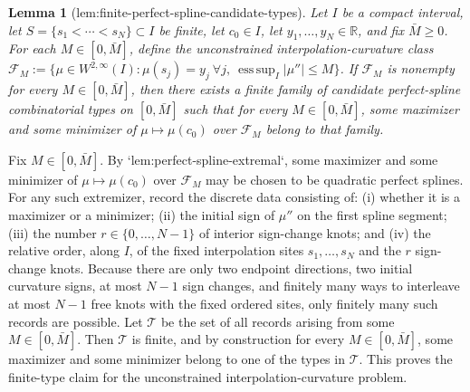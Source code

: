 \documentclass{article}
\newtheorem{lemma}{Lemma}
\begin{document}
\begin{lemma}[lem:finite-perfect-spline-candidate-types]\label{lem:finite-perfect-spline-candidate-types}
Let \(I\) be a compact interval, let \(S=\{s_1<\cdots<s_N\}\subset I\) be finite, let \(c_0\in I\), let \(y_1,\dots,y_N\in \mathbb R\), and fix \(\bar M\ge 0\). For each \(M\in[0,\bar M]\), define the unconstrained interpolation-curvature class \(\mathcal F_M:=\{\mu\in W^{2,\infty}(I): \mu(s_j)=y_j\ \forall j,\ \operatorname*{ess\,sup}_{I}|\mu''|\le M\}\). If \(\mathcal F_M\) is nonempty for every \(M\in[0,\bar M]\), then there exists a finite family of candidate perfect-spline combinatorial types on \([0,\bar M]\) such that for every \(M\in[0,\bar M]\), some maximizer and some minimizer of \(\mu\mapsto\mu(c_0)\) over \(\mathcal F_M\) belong to that family.
\end{lemma}
Fix \(M\in[0,\bar M]\). By `lem:perfect-spline-extremal`, some maximizer and some minimizer of \(\mu\mapsto\mu(c_0)\) over \(\mathcal F_M\) may be chosen to be quadratic perfect splines. For any such extremizer, record the discrete data consisting of: (i) whether it is a maximizer or a minimizer; (ii) the initial sign of \(\mu''\) on the first spline segment; (iii) the number \(r\in\{0,\dots,N-1\}\) of interior sign-change knots; and (iv) the relative order, along \(I\), of the fixed interpolation sites \(s_1,\dots,s_N\) and the \(r\) sign-change knots. Because there are only two endpoint directions, two initial curvature signs, at most \(N-1\) sign changes, and finitely many ways to interleave at most \(N-1\) free knots with the fixed ordered sites, only finitely many such records are possible. Let \(\mathcal T\) be the set of all records arising from some \(M\in[0,\bar M]\). Then \(\mathcal T\) is finite, and by construction for every \(M\in[0,\bar M]\), some maximizer and some minimizer belong to one of the types in \(\mathcal T\). This proves the finite-type claim for the unconstrained interpolation-curvature problem.
\end{document}
